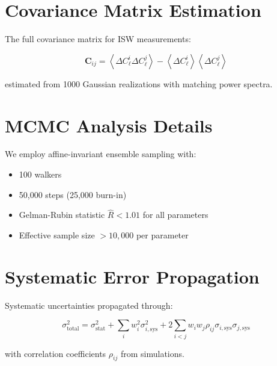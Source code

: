 \documentclass[aps,prd,twocolumn,showpacs,superscriptaddress,groupedaddress,nofootinbib]{revtex4-2}
\begin{document}



\appendix

\section{Covariance Matrix Estimation}
\label{app:covariance}

The full covariance matrix for ISW measurements:

\begin{equation}
\mathbf{C}_{ij} = \left\langle \Delta C_\ell^i \Delta C_\ell^j \right\rangle - \left\langle \Delta C_\ell^i \right\rangle \left\langle \Delta C_\ell^j \right\rangle
\end{equation}

estimated from 1000 Gaussian realizations with matching power spectra.

\section{MCMC Analysis Details}
\label{app:mcmc}

We employ affine-invariant ensemble sampling with:
\begin{itemize}
\item 100 walkers
\item 50,000 steps (25,000 burn-in)
\item Gelman-Rubin statistic $\hat{R} < 1.01$ for all parameters
\item Effective sample size $> 10,000$ per parameter
\end{itemize}

\section{Systematic Error Propagation}
\label{app:systematics}

Systematic uncertainties propagated through:

\begin{equation}
\sigma_{\text{total}}^2 = \sigma_{\text{stat}}^2 + \sum_i w_i^2 \sigma_{i,\text{sys}}^2 + 2\sum_{i<j} w_i w_j \rho_{ij} \sigma_{i,\text{sys}} \sigma_{j,\text{sys}}
\end{equation}

with correlation coefficients $\rho_{ij}$ from simulations.
\end{document}
